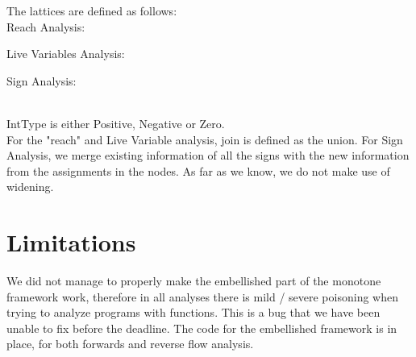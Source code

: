 \documentclass[10pt]{article}
\begin{document}
The lattices are defined as follows: \\ 
Reach Analysis: \\

Live Variables Analysis: \\


Sign Analysis: \\

\\
IntType is either Positive, Negative or Zero.\\

For the "reach" and Live Variable analysis, join is defined as the union. For Sign Analysis, we merge existing information of all the signs with the new information from the assignments in the nodes. As far as we know, we do not make use of widening.

\section{Limitations}
We did not manage to properly make the embellished part of the monotone framework work, therefore in all analyses there is mild / severe poisoning when trying to analyze programs with functions. This is a bug that we have been unable to fix before the deadline. The code for the embellished framework is in place, for both forwards and reverse flow analysis.
\end{document}
